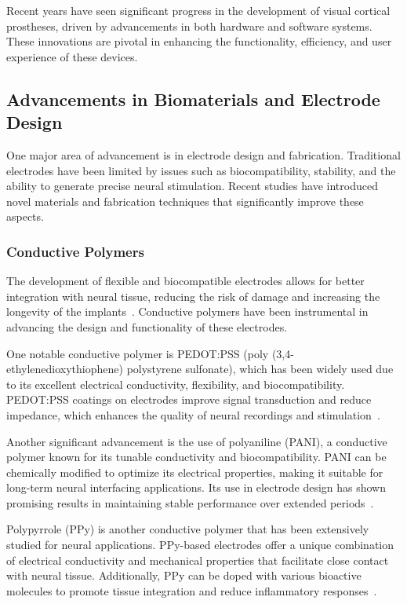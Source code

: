\documentclass[twocolumn,10pt]{article}
\begin{document}
Recent years have seen significant progress in the development of visual
cortical prostheses, driven by advancements in both hardware and software
systems. These innovations are pivotal in enhancing the functionality,
efficiency, and user experience of these devices.

\subsection{Advancements in Biomaterials and Electrode Design}
One major area of advancement is in electrode design and fabrication.
Traditional electrodes have been limited by issues such as biocompatibility,
stability, and the ability to generate precise neural stimulation. Recent
studies have introduced novel materials and fabrication techniques that
significantly improve these aspects.

\subsubsection*{Conductive Polymers}
The development of flexible and biocompatible electrodes allows for better
integration with neural tissue, reducing the risk of damage and increasing the
longevity of the implants~\cite{xiangFlexibleThreedimensionalElectrode2016}.
Conductive polymers have been instrumental in advancing the design and
functionality of these electrodes.

One notable conductive polymer is PEDOT:PSS (poly (3,4-ethylenedioxythiophene)
polystyrene sulfonate), which has been widely used due to its excellent
electrical conductivity, flexibility, and biocompatibility. PEDOT:PSS coatings
on electrodes improve signal transduction and reduce impedance, which enhances
the quality of neural recordings and
stimulation~\cite{rivnayHighperformanceTransistorsBioelectronics2015}.

Another significant advancement is the use of polyaniline (PANI), a conductive
polymer known for its tunable conductivity and biocompatibility. PANI can be
chemically modified to optimize its electrical properties, making it suitable
for long-term neural interfacing applications. Its use in electrode design has
shown promising results in maintaining stable performance over extended
periods~\cite{almuflehHighlyFlexiblePolyanilineBased2021}.

Polypyrrole (PPy) is another conductive polymer that has been extensively
studied for neural applications. PPy-based electrodes offer a unique combination
of electrical conductivity and mechanical properties that facilitate close
contact with neural tissue. Additionally, PPy can be doped with various
bioactive molecules to promote tissue integration and reduce inflammatory
responses~\cite{zareElectroconductiveMultifunctionalPolypyrrole2021a}.
\end{document}
